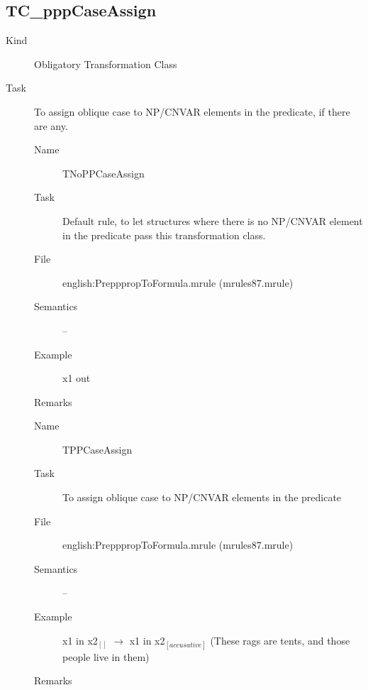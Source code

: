 \subsection{TC\_pppCaseAssign}
\begin{description}
\item[Kind] Obligatory Transformation Class
\item[Task] To assign oblique case to NP/CNVAR elements in the predicate, if 
there are any.

\vspace{1 cm}
\begin{description}
\item[Name] TNoPPCaseAssign
\item[Task] Default rule, to let structures where there is no NP/CNVAR element 
in the predicate pass this transformation class.
\item[File] english:PrepppropToFormula.mrule (mrules87.mrule)
\item[Semantics] --
\item[Example] x1 out
\item[Remarks]
\end{description}

\vspace{1 cm}
\begin{description}
\item[Name] TPPCaseAssign
\item[Task] To assign oblique case to NP/CNVAR elements in the predicate
\item[File] english:PrepppropToFormula.mrule (mrules87.mrule)
\item[Semantics] --
\item[Example] x1 in x2$_{[]}$ $\rightarrow$ x1 in x2$_{[accusative]}$ (These 
rags are tents, and those people live in them)
\item[Remarks] 
\end{description}

\end{description}




